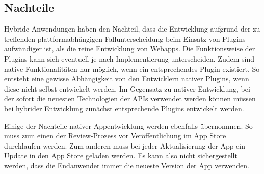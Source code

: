 \subsection{Nachteile}
%
Hybride Anwendungen haben den Nachteil, dass die Entwicklung aufgrund der zu treffenden plattformabhängigen Fallunterscheidung beim Einsatz von Plugins aufwändiger ist, als die reine Entwicklung von Webapps. Die Funktionsweise der Plugins kann sich eventuell je nach Implementierung unterscheiden. Zudem sind native Funktionalitäten nur möglich, wenn ein entsprechendes Plugin existiert. So entsteht eine gewisse Abhängigkeit von den Entwicklern nativer Plugins, wenn diese nicht selbst entwickelt werden. Im Gegensatz zu nativer Entwicklung, bei der sofort die neuesten Technologien der APIs verwendet werden können müssen bei hybrider Entwicklung zunächst entsprechende Plugins entwickelt werden.

Einige der Nachteile nativer Appentwicklung werden ebenfalls übernommen. So muss zum einen der Review-Prozess vor Veröffentlichung im App Store durchlaufen werden. Zum anderen muss bei jeder Aktualisierung der App ein Update in den App Store geladen werden. Es kann also nicht sichergestellt werden, dass die Endanwender immer die neueste Version der App verwenden. 